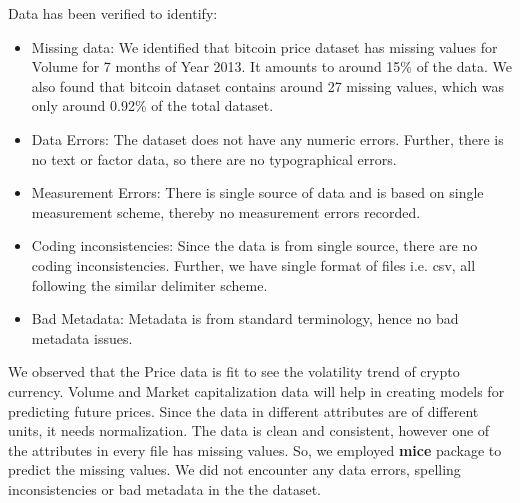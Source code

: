 \documentclass{article}
\begin{document}
Data has been verified to identify:
\begin{itemize}
\item  Missing data: We identified that bitcoin price dataset has missing values for Volume for 7 months of Year 2013. It amounts to around 15\% of the data. We also found that bitcoin dataset contains around 27 missing values, which was only around 0.92\% of the total dataset.

\item Data Errors: The dataset does not have any numeric errors. Further, there is no text or factor data, so there are no typographical errors.

\item Measurement Errors: There is single source of data and is based on single measurement scheme, thereby no measurement errors recorded.

\item Coding inconsistencies: Since the data is from single source, there are no coding inconsistencies. Further, we have single format of files i.e. csv, all following the similar delimiter scheme.

\item Bad Metadata: Metadata is from standard terminology, hence no bad metadata issues.
    
\end{itemize}
We observed that the Price data is fit to see the volatility trend of crypto currency. Volume and Market capitalization data will help in creating models for
predicting future prices. Since the data in different attributes are of different units, it needs normalization. The data is clean and consistent, however one of the attributes in every file has missing values. So, we employed \textbf{mice} package to predict the missing values. We did not encounter any data errors, spelling inconsistencies or bad metadata in the the dataset.
\end{document}
